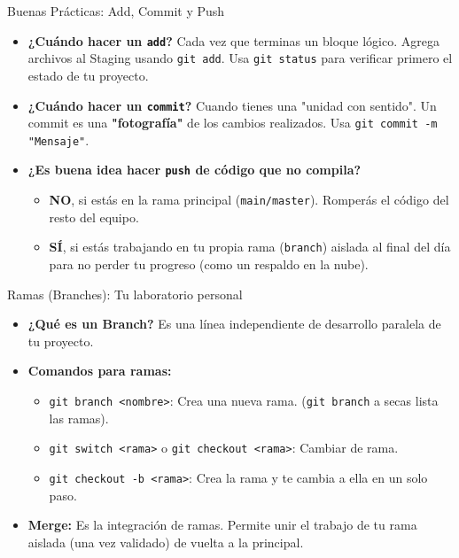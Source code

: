 \documentclass[11pt, aspectratio=169]{beamer}
\begin{document}
\begin{frame}{Buenas Prácticas: Add, Commit y Push}
    \begin{itemize}
        \item \textbf{¿Cuándo hacer un \texttt{add}?} Cada vez que terminas un bloque lógico. Agrega archivos al Staging usando \texttt{git add}. Usa \texttt{git status} para verificar primero el estado de tu proyecto.
        \item \textbf{¿Cuándo hacer un \texttt{commit}?} Cuando tienes una "unidad con sentido". Un commit es una \textbf{"fotografía"} de los cambios realizados. Usa \texttt{git commit -m "Mensaje"}.
        \item \textbf{¿Es buena idea hacer \texttt{push} de código que no compila?} 
        \begin{itemize}
            \item \textbf{NO}, si estás en la rama principal (\texttt{main/master}). Romperás el código del resto del equipo.
            \item \textbf{SÍ}, si estás trabajando en tu propia rama (\texttt{branch}) aislada al final del día para no perder tu progreso (como un respaldo en la nube).
        \end{itemize}
    \end{itemize}
\end{frame}

\begin{frame}{Ramas (Branches): Tu laboratorio personal}
    \begin{itemize}
        \item \textbf{¿Qué es un Branch?} Es una línea independiente de desarrollo paralela de tu proyecto.
        \item \textbf{Comandos para ramas:}
        \begin{itemize}
            \item \texttt{git branch <nombre>}: Crea una nueva rama. (\texttt{git branch} a secas lista las ramas).
            \item \texttt{git switch <rama>} o \texttt{git checkout <rama>}: Cambiar de rama.
            \item \texttt{git checkout -b <rama>}: Crea la rama y te cambia a ella en un solo paso.
        \end{itemize}
        \item \textbf{Merge:} Es la integración de ramas. Permite unir el trabajo de tu rama aislada (una vez validado) de vuelta a la principal.
    \end{itemize}
\end{frame}
\end{document}
